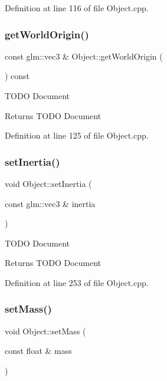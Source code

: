 Definition at line 116 of file Object.\+cpp.

\mbox{\label{class_object_a1054369eab029c63e58de78b88bbd627}} 
\subsubsection{\texorpdfstring{get\+World\+Origin()}{getWorldOrigin()}}
{\footnotesize\ttfamily const glm\+::vec3 \& Object\+::get\+World\+Origin (\begin{DoxyParamCaption}{ }\end{DoxyParamCaption}) const}

T\+O\+DO Document \begin{DoxyReturn}{Returns}
T\+O\+DO Document 
\end{DoxyReturn}


Definition at line 125 of file Object.\+cpp.

\mbox{\label{class_object_a1a82190deb7c8c2da2f3e82562aa7b17}} 
\subsubsection{\texorpdfstring{set\+Inertia()}{setInertia()}}
{\footnotesize\ttfamily void Object\+::set\+Inertia (\begin{DoxyParamCaption}\item[{const glm\+::vec3 \&}]{inertia }\end{DoxyParamCaption})}

T\+O\+DO Document \begin{DoxyReturn}{Returns}
T\+O\+DO Document 
\end{DoxyReturn}


Definition at line 253 of file Object.\+cpp.

\mbox{\label{class_object_a426314ec1a1e0ae48cbb2b3667c63bb6}} 
\subsubsection{\texorpdfstring{set\+Mass()}{setMass()}}
{\footnotesize\ttfamily void Object\+::set\+Mass (\begin{DoxyParamCaption}\item[{const float \&}]{mass }\end{DoxyParamCaption})}

